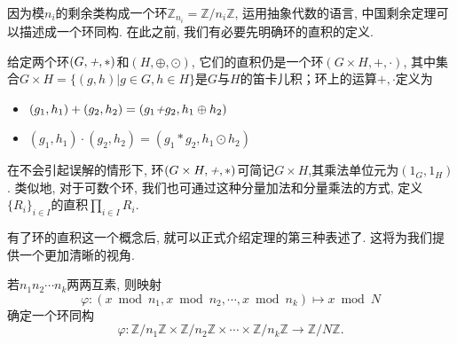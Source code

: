 \documentclass[color=green,mathpazo,titlestyle=hang]{elegantbook}
\begin{document}
  因为模$n_i$的剩余类构成一个环$\mathbb{Z}_{n_i}=\mathbb{Z}/n_i\mathbb{Z}$, 运用抽象代数的语言, 中国剩余定理可以描述成一个环同构. 在此之前, 我们有必要先明确环的直积的定义.



\begin{newdef}[环的直积]
	给定两个环$(G,\emph{+},\ast)$和$(H,\oplus,\odot)$, 它们的直积仍是一个环$(G\times H,+,\cdot)$, 其中集合$G\times H=\{(g,h)|g\in G, h\in H\}$是$G$与$H$的笛卡儿积；环上的运算$+,\cdot$定义为
	\begin{itemize}
		\parskip=0pt \itemsep=0pt
		\item $(g_1,h_1)+(g_2,h_2)=(g_1\emph{+}g_2,h_1\oplus h_2)$
		\item $(g_1,h_1)\cdot(g_2,h_2)=(g_1\ast g_2,h_1\odot h_2)$
	\end{itemize}
	在不会引起误解的情形下, 环$(G\times H,\emph{+},\ast)$可简记$G\times H$,其乘法单位元为$(1_G,1_H)$. 类似地, 对于可数个环, 我们也可通过这种分量加法和分量乘法的方式, 定义$\{R_i\}_{i\in I}$的直积$\prod\limits_{i\in I}R_i$.
\end{newdef}


  有了环的直积这一个概念后, 就可以正式介绍定理的第三种表述了. 这将为我们提供一个更加清晰的视角.

  
  \begin{newthem}[中国剩余定理III]
  	若$n_1n_2\cdots n_k$两两互素, 则映射
  	\[
  	\varphi:(x\bmod n_1,x\bmod n_2,\cdots,x\bmod n_k)\longmapsto x\bmod N
  	\]
  	确定一个环同构
  	\[
  	\varphi:\mathbb{Z}/n_1\mathbb{Z}\times\mathbb{Z}/n_2\mathbb{Z}\times\cdots\times\mathbb{Z}/n_k\mathbb{Z}\longrightarrow\mathbb{Z}/N\mathbb{Z}.
  	\]
  

  \end{newthem}
\end{document}
